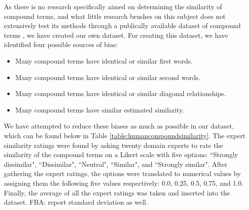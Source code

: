 \documentclass{article}
\newcommand\fba[1]{\textcolor{SeaGreen3}{FBA: #1}}
\begin{document}
As there is no research specifically aimed on determining the similarity of compound terms, and what little research brushes on this subject does not extensively test its methods through a publically available dataset of compound terms \cite{jeong2009functional}, we have created our own dataset. For creating this dataset, we have identified four possible sources of bias:
\begin{itemize}
	\item Many compound terms have identical or similar first words.
	\item Many compound terms have identical or similar second words.
	\item Many compound terms have identical or similar diagonal relationships.
	\item Many compound terms have similar estimated similarity.
\end{itemize}
We have attempted to reduce these biases as much as possible in our dataset, which can be found below in Table \ref{table:humancompoundsimilarity}. The expert similarity ratings were found by asking twenty domain experts to rate the similarity of the compound terms on a Likert scale with five options: ``Strongly dissimilar", ``Dissimilar", ``Neutral", ``Similar", and ``Strongly similar". After gathering the expert ratings, the options were translated to numerical values by assigning them the following five values respectively: 0.0, 0.25, 0.5, 0.75, and 1.0. Finally, the average of all the expert ratings was taken and inserted into the dataset. \fba{report standard deviation as well.}
\end{document}
